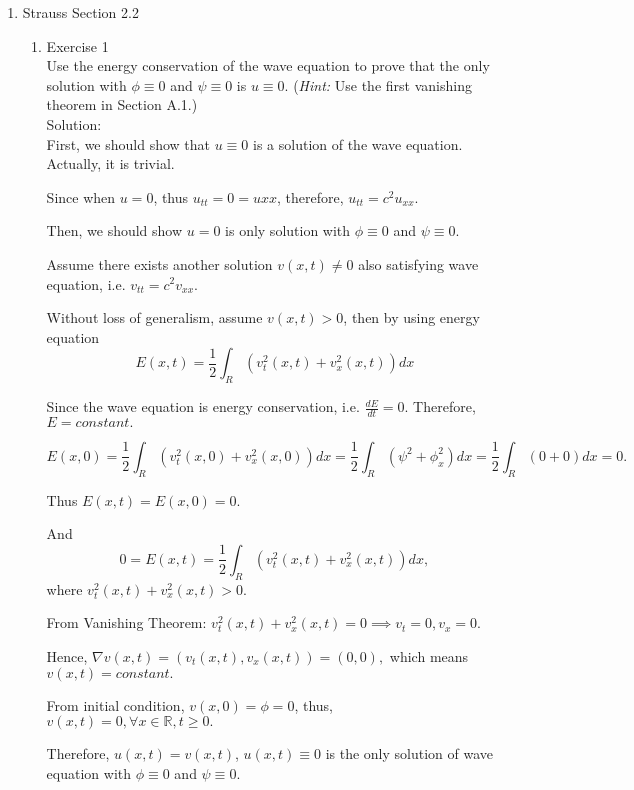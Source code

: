 \documentclass[12pt]{article}%
\begin{document}
\begin{enumerate}
   \pagebreak
    
    \item Strauss Section 2.2 \smallskip
    \begin{enumerate}
        \item Exercise 1 \smallskip \\
        Use the energy conservation of the wave equation to prove that the only solution with $\phi \equiv 0$ and $\psi \equiv 0$ is $u \equiv 0$. (\emph{Hint:} Use the first vanishing theorem in Section A.1.) \smallskip \\
        Solution:\\
         First, we should show that $u\equiv0$ is a solution of the wave equation. Actually, it is trivial. 
        
        Since when $u=0$, thus $u_{tt}=0=u{xx}$, therefore, $u_{tt}=c^2u_{xx}$.
        
        Then, we should show $u=0$ is only solution with $\phi \equiv 0$ and $\psi \equiv 0$.
        
        Assume there exists another solution $v(x,t)\ne 0$ also satisfying wave equation, i.e. $v_{tt}=c^2v_{xx}.$

        Without loss of generalism, assume $v(x,t)> 0$, then by using energy equation
        \[ E(x,t)=\frac{1}{2}\int_{R} \left(v_{t}^{2}(x,t)+v_{x}^{2}(x,t)\right)dx\]

        Since the wave equation is energy conservation, i.e. $\frac{dE}{dt}=0.$ Therefore, $E = constant.$
        
        \[E(x,0)= \frac{1}{2}\int_{R}\left(v_{t}^{2}(x,0)+v_{x}^{2}(x,0)\right)dx=\frac{1}{2}\int_{R}\left(\psi^{2}+\phi_{x}^{2}\right)dx=\frac{1}{2}\int_{R}(0+0)dx =0.\]

        Thus $E(x,t)=E(x,0)=0.$

        And \[ 0=E(x,t)=\frac{1}{2}\int_{R} \left(v_{t}^{2}(x,t)+v_{x}^{2}(x,t)\right)dx,\] where $ v_{t}^{2}(x,t)+v_{x}^{2} (x,t)>0.$ 

        From Vanishing Theorem: $v_{t}^{2}(x,t)+v_{x}^{2}(x,t)=0 \implies v_{t}=0, v_{x}=0.$

        Hence, $ \nabla v(x,t)=(v_t(x,t),v_x(x,t))=(0,0),$ which means $v(x,t)=constant.$

        From initial condition, $v(x,0)= \phi =0$, thus, $v(x,t)=0, \forall x\in \mathbb{R}, t\ge 0.$

        Therefore, $u(x,t)=v(x,t)$, $u(x,t)\equiv 0$ is the only solution of wave equation with $\phi \equiv 0$ and $\psi \equiv 0$.
        

\end{enumerate}
\end{enumerate}
\end{document}

